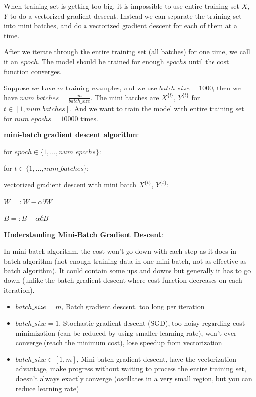 \documentclass{article}
\begin{document}
\noindent When training set is getting too big, it is impossible to use entire training set \(X\), \(Y\) to do a vectorized gradient descent. Instead we can separate the training set into mini batches, and do a vectorized gradient descent for each of them at a time.

\bigskip

\noindent After we iterate through the entire training set (all batches) for one time, we call it an \(epoch\). The model should be trained for enough \(epochs\) until the cost function converges.

\bigskip

\noindent Suppose we have \(m\) training examples, and we use \(batch\_size = 1000\), then we have \(num\_batches = \frac{m}{batch\_size}\). The mini batches are \(X^{\{t\}}\), \(Y^{\{t\}}\) for \(t \in [1, num\_batches]\). And we want to train the model with entire training set for \(num\_epochs = 10000\) times.

\bigskip

\noindent \textbf{mini-batch gradient descent algorithm}:

\noindent for \(epoch \in \{1, \dots, num\_epochs\}\):

\noindent \hspace{.5cm} for \(t \in \{1, \dots, num\_batches\}\):

\noindent \hspace{1cm} vectorized gradient descent with mini batch \(X^{\{t\}}\), \(Y^{\{t\}}\):

\noindent \hspace{1cm} \(W =: W - \alpha \partial W\)

\noindent \hspace{1cm} \(B =: B - \alpha \partial B\)

\bigskip

\noindent \textbf{Understanding Mini-Batch Gradient Descent}:

\noindent In mini-batch algorithm, the cost won't go down with each step as it does in batch algorithm (not enough training data in one mini batch, not as effective as batch algorithm). It could contain some ups and downs but generally it has to go down (unlike the batch gradient descent where cost function decreases on each iteration).

\begin{itemize}
  \item \(batch\_size = m\), Batch gradient descent, too long per iteration
  \item \(batch\_size = 1\), Stochastic gradient descent (SGD), too noisy regarding cost minimization (can be reduced by using smaller learning rate), won't ever converge (reach the minimum cost), lose speedup from vectorization
  \item \(batch\_size \in [1, m]\), Mini-batch gradient descent, have the vectorization advantage, make progress without waiting to process the entire training set, doesn't always exactly converge (oscillates in a very small region, but you can reduce learning rate)
\end{itemize}
\end{document}
